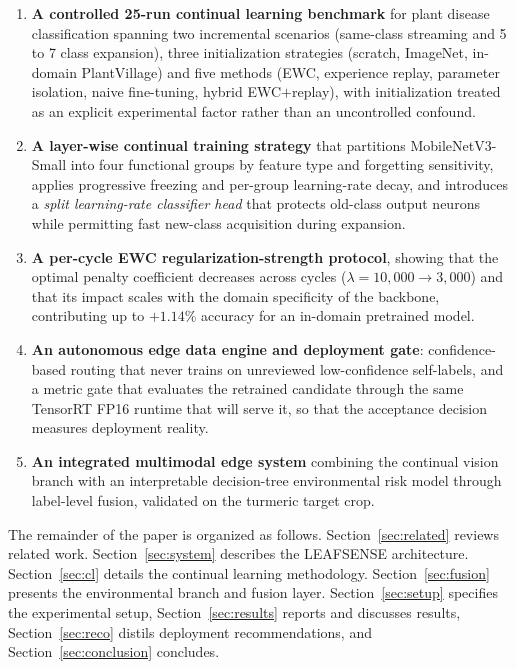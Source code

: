 \documentclass[journal]{IEEEtran}
\begin{document}
\begin{enumerate}
\item \textbf{A controlled 25-run continual learning benchmark} for plant disease
classification spanning two incremental scenarios (same-class streaming and
5 to 7 class expansion), three initialization strategies (scratch,
ImageNet, in-domain PlantVillage) and five methods (EWC, experience replay,
parameter isolation, naive fine-tuning, hybrid EWC$+$replay), with initialization
treated as an explicit experimental factor rather than an uncontrolled confound.
\item \textbf{A layer-wise continual training strategy} that partitions
MobileNetV3-Small into four functional groups by feature type and forgetting
sensitivity, applies progressive freezing and per-group learning-rate decay, and
introduces a \emph{split learning-rate classifier head} that protects old-class
output neurons while permitting fast new-class acquisition during expansion.
\item \textbf{A per-cycle EWC regularization-strength protocol}, showing that the
optimal penalty coefficient decreases across cycles ($\lambda=10{,}000
\rightarrow 3{,}000$) and that its impact scales with the domain specificity of the
backbone, contributing up to $+1.14\%$ accuracy for an in-domain pretrained model.
\item \textbf{An autonomous edge data engine and deployment gate}: confidence-based
routing that never trains on unreviewed low-confidence self-labels, and a metric gate
that evaluates the retrained candidate through the same TensorRT FP16 runtime that
will serve it, so that the acceptance decision measures deployment reality.
\item \textbf{An integrated multimodal edge system} combining the continual vision
branch with an interpretable decision-tree environmental risk model through
label-level fusion, validated on the turmeric target crop.
\end{enumerate}

The remainder of the paper is organized as follows. Section~\ref{sec:related}
reviews related work. Section~\ref{sec:system} describes the LEAFSENSE architecture.
Section~\ref{sec:cl} details the continual learning methodology.
Section~\ref{sec:fusion} presents the environmental branch and fusion layer.
Section~\ref{sec:setup} specifies the experimental setup, Section~\ref{sec:results}
reports and discusses results, Section~\ref{sec:reco} distils deployment
recommendations, and Section~\ref{sec:conclusion} concludes.
\end{document}
